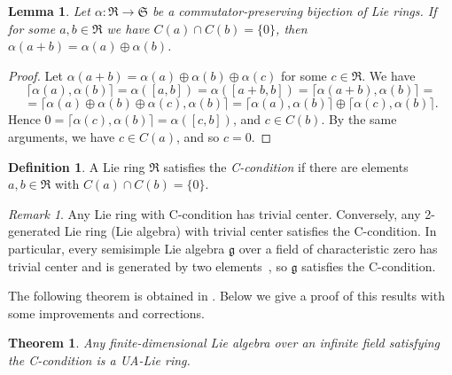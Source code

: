 \documentclass[a4paper,draft,reqno,12pt]{amsart}
\newtheorem{lemma}{Lemma}
\newtheorem{theorem}{Theorem}
\theoremstyle{definition}
\newtheorem{definition}{Definition}
\theoremstyle{remark}
\newtheorem {remark}{Remark}
\def\RRR{\mathfrak{R}}
\def\SSS{\mathfrak{S}}
\def\ggg{\mathfrak{g}}
\begin{document}
\begin{lemma} 
\label{TL}
Let $\alpha\colon\RRR\to\SSS$ be a commutator-preserving bijection of Lie rings. If  
for some $a,b\in\RRR$ we have $C(a)\cap C(b)=\{0\}$, then $\alpha(a+b)=\alpha(a)\oplus\alpha(b)$. 
\end{lemma}
%
\begin{proof}
Let $\alpha(a+b)=\alpha(a)\oplus\alpha(b)\oplus\alpha(c)$ for some $c\in\mathfrak{R}$. We have 
$$
\lceil\alpha(a),\alpha(b)\rceil=\alpha([a,b])=\alpha([a+b,b])=\lceil\alpha(a+b),\alpha(b)\rceil=
$$
$$
=\lceil\alpha(a)\oplus\alpha(b)\oplus\alpha(c),\alpha(b)\rceil=\lceil\alpha(a),\alpha(b)\rceil\oplus\lceil\alpha(c),\alpha(b)\rceil.
$$
Hence $0=\lceil\alpha(c),\alpha(b)\rceil=\alpha([c,b])$, and $c\in C(b)$. By the same arguments, we have $c\in C(a)$, and so $c=0$. 
\end{proof} 

\begin{definition}
A Lie ring $\mathfrak{R}$ satisfies the {\it C-condition} if there are elements $a,b\in \mathfrak{R}$ with $C(a)\cap C(b)=\{0\}$. 
\end{definition}

\begin{remark}
Any Lie ring with C-condition has trivial center. Conversely, any 2-generated Lie ring (Lie algebra) with trivial center satisfies the C-condition. In particular, every semisimple Lie algebra $\ggg$ over a field of characteristic zero has trivial center and is generated by two elements~\cite[Theorem~6]{Ku}, so $\ggg$ satisfies the C-condition. 
\end{remark}

The following theorem is obtained in \cite[Theorem~3.2]{A4}. Below we give a proof of this results with some improvements and corrections. 

\begin{theorem}
\label{TCC}
Any finite-dimensional Lie algebra over an infinite field satisfying the C-condition is a UA-Lie ring.
\end{theorem} 
\end{document}
